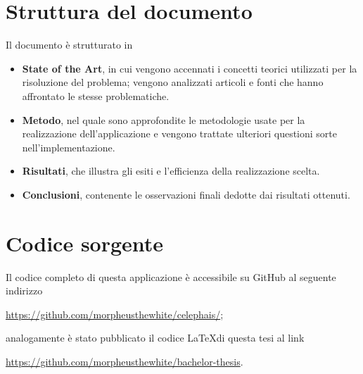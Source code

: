 \section{Struttura del documento}
\label{section:doc_structure}

Il documento è strutturato in 

\begin{itemize}
    \item \textbf{State of the Art}, in cui vengono accennati i concetti teorici utilizzati per la risoluzione 
        del problema; vengono analizzati articoli e fonti che hanno affrontato le stesse problematiche. 
    \item \textbf{Metodo}, nel quale sono approfondite le metodologie usate per la realizzazione 
        dell'applicazione e vengono trattate ulteriori questioni sorte nell'implementazione.
    \item \textbf{Risultati}, che illustra gli esiti e l'efficienza della realizzazione scelta.
    \item \textbf{Conclusioni}, contenente le osservazioni finali dedotte dai risultati ottenuti.
\end{itemize}

\section{Codice sorgente}

Il codice completo di questa applicazione è accessibile su GitHub al seguente 
indirizzo 

\begin{center}
    \url{https://github.com/morpheusthewhite/celephais/}; 
\end{center}

\noindent
analogamente è stato pubblicato il codice \LaTeX di questa tesi al link 

\begin{center}
    \url{https://github.com/morpheusthewhite/bachelor-thesis}.     
\end{center}
